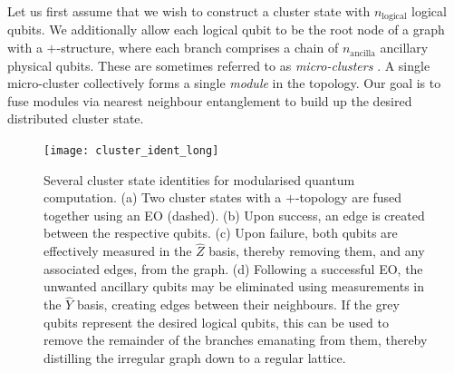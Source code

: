 Let us first assume that we wish to construct a cluster state with $n_\mathrm{logical}$ logical qubits. We additionally allow each logical qubit to be the root node of a graph with a $+$-structure, where each branch comprises a chain of $n_\mathrm{ancilla}$ ancillary physical qubits. These are sometimes referred to as \textit{micro-clusters} \cite{bib:Nielsen04}. A single micro-cluster collectively forms a single \textit{module} in the topology. Our goal is to fuse modules via nearest neighbour entanglement to build up the desired distributed cluster state.

\pubmode
\begin{figure}[!htbp]
	\texttt{[image: cluster\_ident\_long]}
	\captionspace \caption{Several cluster state identities for modularised quantum computation. (a) Two cluster states with a $+$-topology are fused together using an EO (dashed). (b) Upon success, an edge is created between the respective qubits. (c) Upon failure, both qubits are effectively measured in the $\hat{Z}$ basis, thereby removing them, and any associated edges, from the graph. (d) Following a successful EO, the unwanted ancillary qubits may be eliminated using measurements in the $\hat{Y}$ basis, creating edges between their neighbours. If the grey qubits represent the desired logical qubits, this can be used to remove the remainder of the branches emanating from them, thereby distilling the irregular graph down to a regular lattice.} \label{fig:plus_cluster_ident}
	\end{figure}
\else
